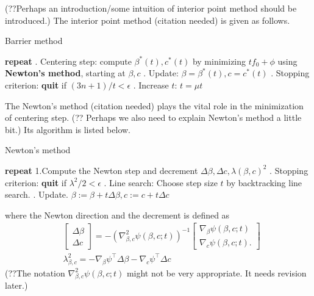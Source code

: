 \documentclass[final,onefignum,onetabnum]{siamart190516}
\begin{document}
(??Perhaps an introduction/some intuition of interior point method should be introduced.) The interior point method (citation needed) is given as follows.
\begin{algorithm}[H]
\caption{Barrier method}
\label{alg: barrier method}
\begin{algorithmic}
\STATE \textbf{repeat}
. Centering step: compute $\beta^*(t), c^*(t)$ by minimizing $tf_0+\phi$ using \textbf{Newton's method}, starting at $\beta, c$
. Update: $\beta = \beta^*(t), c = c^*(t)$
. Stopping criterion: \textbf{quit} if $(3n+1)/t<\epsilon$
. Increase $t$: $t = \mu t$
\end{algorithmic}
\end{algorithm}
The Newton's method (citation needed) plays the vital role in the minimization of centering step. (?? Perhaps we also need to explain Newton's method a little bit.) Its algorithm is listed below.
\begin{algorithm}[H]
\caption{Newton's method}
\label{alg: newton's method}
\begin{algorithmic}
\STATE \textbf{repeat}
\STATE 1.Compute the Newton step and decrement $\Delta \beta, \Delta c, \lambda(\beta, c)^2$
. Stopping criterion: \textbf{quit} if $\lambda^2/2<\epsilon$
. Line search: Choose step size $t$ by backtracking line search.
. Update. $\beta := \beta + t\Delta\beta, c:=c+t\Delta c$
\end{algorithmic}
\end{algorithm}
where the Newton direction and the decrement is defined as
\begin{equation}\label{DeltaNTdef}
    \begin{aligned}
    &\begin{bmatrix}
    \Delta \beta\\
    \Delta c
    \end{bmatrix} = -(\nabla^2_{\beta,c} \psi(\beta,c;t))^{-1}
    \begin{bmatrix}
    \nabla_{\beta}\psi(\beta,c;t)\\
    \nabla_c\psi(\beta,c;t).
    \end{bmatrix}\\
    & \lambda_{\beta, c}^2 = -\nabla_{\beta} \psi^{\top}\Delta\beta - \nabla_{c} \psi^{\top}\Delta c
    \end{aligned}
\end{equation}
(??The notation $\nabla^2_{\beta,c} \psi(\beta,c;t)$ might not be very appropriate. It needs revision later.)
\end{document}
